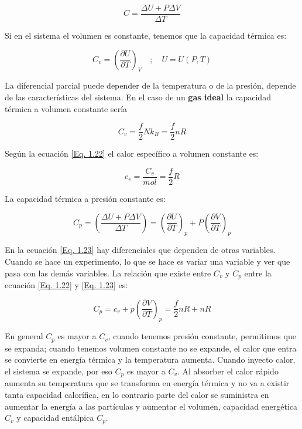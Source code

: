 \documentclass[11pt,fleqn]{book}
\begin{document}
\begin{equation}
    C=\frac{\Delta U+P\Delta V}{\Delta T}
    \label{Eq. 1.20}
\end{equation}

Si en el sistema el volumen es constante, tenemos que la capacidad térmica es:

\begin{equation}
    C_{v}=\left(\frac{\partial U}{\partial T}\right)_{V} \quad;\quad U=U(P,T)
    \label{Eq. 1.21}
\end{equation}

La diferencial parcial puede depender de la temperatura o de la presión, depende de las características del sistema. En el caso de un \textbf{gas ideal} la capacidad térmica a volumen constante sería 

\begin{equation}
    C_{v}=\frac{f}{2}Nk_{B}=\frac{f}{2}nR
    \label{Eq. 1.22}
\end{equation}

Según la ecuación \ref{Eq. 1.22} el calor específico a volumen constante es:

\begin{equation*}
    c_{v}=\frac{C_{v}}{mol}=\frac{f}{2}R
\end{equation*}
 
La capacidad térmica a presión constante es:

\begin{equation}
    C_{p}=\left(\frac{\Delta U+P\Delta V}{\Delta T}\right)=\left(\frac{\partial U}{\partial T}\right)_{p}+P\left(\frac{\partial V}{\partial T}\right)_{p}
    \label{Eq. 1.23}
\end{equation}

En la ecuación \ref{Eq. 1.23} hay diferenciales que dependen de otras variables. Cuando se hace un experimento, lo que se hace es variar una variable y ver que pasa con las demás variables. La relación que existe entre $C_{v}$ y $C_{p}$ entre la ecuación \ref{Eq. 1.22} y \ref{Eq. 1.23} es:

\begin{equation}
    C_{p}=c_{v}+p\left(\frac{\partial V}{\partial T}\right)_{p}=\frac{f}{2}nR+nR
    \label{Eq. 1.24}
\end{equation}

En general $C_{p}$ es mayor a $C_{v}$, cuando tenemos presión constante, permitimos que se expanda; cuando tenemos volumen constante no se expande, el calor que entra se convierte en energía térmica y la temperatura aumenta. Cuando inyecto calor, el sistema se expande, por eso $C_{p}$ es mayor a $C_{v}$. Al absorber el calor rápido aumenta su temperatura que se transforma en energía térmica y no va a existir tanta capacidad calorífica, en lo contrario parte del calor se suministra en aumentar la energía a las partículas y aumentar el volumen, capacidad energética $C_{v}$ y capacidad entálpica $C_{p}$. 
\end{document}
